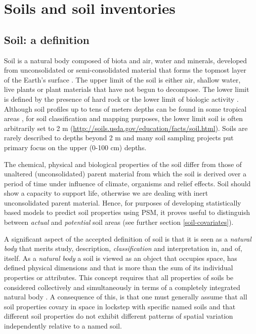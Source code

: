 \documentclass[11pt]{krantz}
\theoremstyle{definition}
\theoremstyle{definition}
\theoremstyle{definition}
\theoremstyle{remark}
\begin{document}
\hypertarget{soils-and-soil-inventories}{%
\section{Soils and soil inventories}\label{soils-and-soil-inventories}}

\hypertarget{soil-a-definition}{%
\subsection{Soil: a definition}\label{soil-a-definition}}

Soil is a natural body composed of biota and air, water and minerals,
developed from unconsolidated or semi-consolidated material that forms
the topmost layer of the Earth's surface
\citep{chesworth2008encyclopedia}. The upper limit of the soil is either
air, shallow water, live plants or plant materials that have not begun
to decompose. The lower limit is defined by the presence of hard rock or
the lower limit of biologic activity \citep{richter1995deep, SSDS1993}.
Although soil profiles up to tens of meters depths can be found in some
tropical areas \citep{richter1995deep}, for soil classification and
mapping purposes, the lower limit soil is often arbitrarily set to 2 m
(\url{http://soils.usda.gov/education/facts/soil.html}). Soils are
rarely described to depths beyond 2 m and many soil sampling projects
put primary focus on the upper (0-100 cm) depths.

The chemical, physical and biological properties of the soil differ from
those of unaltered (unconsolidated) parent material from which the soil
is derived over a period of time under influence of climate, organisms
and relief effects. Soil should show a capacity to support life,
otherwise we are dealing with inert unconsolidated parent material.
Hence, for purposes of developing statistically based models to predict
soil properties using PSM, it proves useful to distinguish between
\emph{actual} and \emph{potential} soil areas (see further section
\ref{soil-covariates}).

A significant aspect of the accepted definition of soil is that it is
seen as a \emph{natural body} that merits study, description,
\emph{classification} and interpretation in, and of, itself. As a
\emph{natural body} a soil is viewed as an object that occupies space,
has defined physical dimensions and that is more than the sum of its
individual properties or attributes. This concept requires that all
properties of soils be considered collectively and simultaneously in
terms of a completely integrated natural body \citep{SSDS1993}. A
consequence of this, is that one must generally assume that all soil
properties covary in space in lockstep with specific named soils and
that different soil properties do not exhibit different patterns of
spatial variation independently relative to a named soil.
\end{document}
